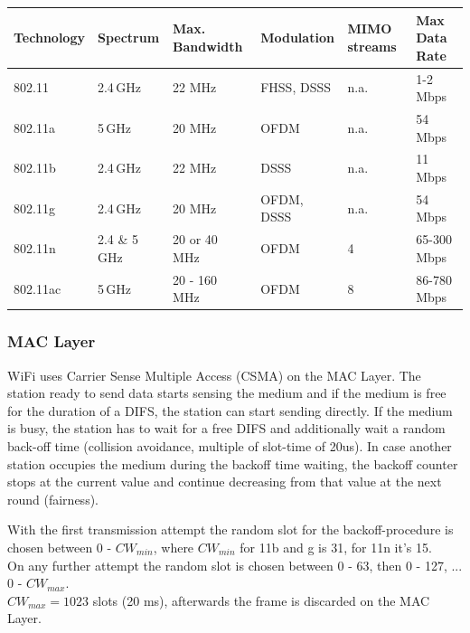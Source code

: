\begin{tabular}{|l|l|p{3cm}|p{3cm}|l|l|} \hline
Technology & Spectrum & Max. Bandwidth & Modulation & MIMO streams & Max Data Rate
\\ \hline \hline
802.11  & 2.4\,GHz  & 22 MHz           & FHSS, DSSS  & n.a. & 1-2\,Mbps  \\ \hline
802.11a    &   5\,GHz  & 20 MHz           & OFDM      & n.a. & 54\,Mbps \\ \hline
802.11b    & 2.4\,GHz  & 22 MHz          & DSSS     & n.a. & 11\,Mbps \\ \hline
802.11g    & 2.4\,GHz  & 20 MHz           & OFDM, DSSS   & n.a.  & 54\,Mbps \\ \hline
802.11n   & 2.4 \& 5\,GHz & 20 or 40 MHz	     & OFDM  & 4 & 65-300\,Mbps \\ \hline
802.11ac   &   5\,GHz  & 20 - 160 MHz 	  & OFDM	& 8 & 86-780\,Mbps \\ \hline
\end{tabular}

\subsubsection{MAC Layer}
WiFi uses Carrier Sense Multiple Access (CSMA) on the MAC Layer. The station ready to send data starts sensing the medium and 
if the medium is free for the duration of a DIFS, the station can start sending directly. If the medium is busy, the station has to 
wait for a free DIFS and additionally wait a random back-off time (collision avoidance, multiple of slot-time of 20us). In case 
another station occupies the medium during the backoff time waiting, the backoff counter stops at the current value and continue
decreasing from that value at the next round (fairness). 

With the first transmission attempt the random slot for the backoff-procedure is chosen between 0 - $CW_{min}$, where $CW_{min}$ for 11b and g is 31, for 11n it's 15. \\
On any further attempt the random slot is chosen between 0 - 63, then 0 - 127, ... 0 - $CW_{max}$. \\
$CW_{max}=1023$ slots (20 ms), afterwards the frame is discarded on the MAC Layer. \\

